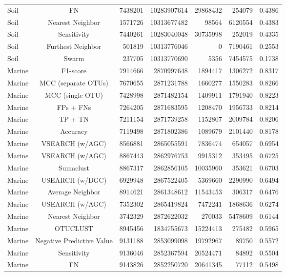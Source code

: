 \documentclass[]{article}
\begin{document}
\begin{table}[!ht]
\begin{tabular}{lcrrrrc}
  Soil & FN & 7438201 & 10283907614 & 29868432 & 254079 & 0.4386 \\ 
  Soil & Nearest Neighbor & 1571726 & 10313677482 & 98564 & 6120554 & 0.4383 \\ 
  Soil & Sensitivity & 7440261 & 10283040048 & 30735998 & 252019 & 0.4335 \\ 
  Soil & Furthest Neighbor & 501819 & 10313776046 & 0 & 7190461 & 0.2553 \\ 
  Soil & Swarm & 237705 & 10313770690 & 5356 & 7454575 & 0.1738 \\ 
  Marine & F1-score & 7914666 & 2870997648 & 1894417 & 1306272 & 0.8317 \\ 
  Marine & MCC (separate OTUs) & 7670655 & 2871231788 & 1660277 & 1550283 & 0.8266 \\ 
  Marine & MCC (single OTU) & 7428998 & 2871482154 & 1409911 & 1791940 & 0.8223 \\ 
  Marine & FPs + FNs & 7264205 & 2871683595 & 1208470 & 1956733 & 0.8214 \\ 
  Marine & TP + TN & 7211154 & 2871739258 & 1152807 & 2009784 & 0.8206 \\ 
  Marine & Accuracy & 7119498 & 2871802386 & 1089679 & 2101440 & 0.8178 \\ 
  Marine & VSEARCH (w/AGC) & 8566881 & 2865055591 & 7836474 & 654057 & 0.6954 \\ 
  Marine & VSEARCH (w/AGC) & 8867443 & 2862976753 & 9915312 & 353495 & 0.6725 \\ 
  Marine & Sumaclust & 8867317 & 2862856105 & 10035960 & 353621 & 0.6703 \\ 
  Marine & USEARCH (w/DGC) & 6929948 & 2867522405 & 5369660 & 2290990 & 0.6494 \\ 
  Marine & Average Neighbor & 8914621 & 2861348612 & 11543453 & 306317 & 0.6476 \\ 
  Marine & USEARCH (w/AGC) & 7352302 & 2865419824 & 7472241 & 1868636 & 0.6274 \\ 
  Marine & Nearest Neighbor & 3742329 & 2872622032 & 270033 & 5478609 & 0.6144 \\ 
  Marine & OTUCLUST & 8945456 & 1834755673 & 15224413 & 275482 & 0.5965 \\ 
  Marine & Negative Predictive Value & 9131188 & 2853099098 & 19792967 & 89750 & 0.5572 \\ 
  Marine & Sensitivity & 9136046 & 2852367594 & 20524471 & 84892 & 0.5504 \\ 
  Marine & FN & 9143826 & 2852250720 & 20641345 & 77112 & 0.5498 \\ 

\end{tabular}
\end{table}
\end{document}
